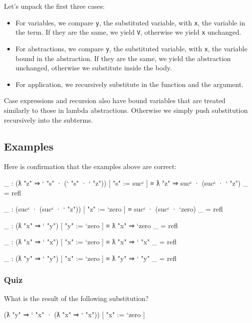 Let's unpack the first three cases:

\begin{itemize}
\item
  For variables, we compare \texttt{y}, the substituted variable, with
  \texttt{x}, the variable in the term. If they are the same, we yield
  \texttt{V}, otherwise we yield \texttt{x} unchanged.
\item
  For abstractions, we compare \texttt{y}, the substituted variable,
  with \texttt{x}, the variable bound in the abstraction. If they are
  the same, we yield the abstraction unchanged, otherwise we substitute
  inside the body.
\item
  For application, we recursively substitute in the function and the
  argument.
\end{itemize}

Case expressions and recursion also have bound variables that are
treated similarly to those in lambda abstractions. Otherwise we simply
push substitution recursively into the subterms.

\hypertarget{examples}{%
\subsection{Examples}\label{examples}}

Here is confirmation that the examples above are correct:

\begin{fence}
\begin{code}
_ : (ƛ "z" ⇒ ` "s" · (` "s" · ` "z")) [ "s" := sucᶜ ] ≡ ƛ "z" ⇒ sucᶜ · (sucᶜ · ` "z")
_ = refl

_ : (sucᶜ · (sucᶜ · ` "z")) [ "z" := `zero ] ≡ sucᶜ · (sucᶜ · `zero)
_ = refl

_ : (ƛ "x" ⇒ ` "y") [ "y" := `zero ] ≡ ƛ "x" ⇒ `zero
_ = refl

_ : (ƛ "x" ⇒ ` "x") [ "x" := `zero ] ≡ ƛ "x" ⇒ ` "x"
_ = refl

_ : (ƛ "y" ⇒ ` "y") [ "x" := `zero ] ≡ ƛ "y" ⇒ ` "y"
_ = refl
\end{code}
\end{fence}

\hypertarget{quiz}{%
\subsubsection{Quiz}\label{quiz}}

What is the result of the following substitution?

\begin{myDisplay}
(ƛ "y" ⇒ ` "x" · (ƛ "x" ⇒ ` "x")) [ "x" := `zero ]
\end{myDisplay}

